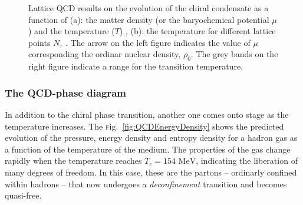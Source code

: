 \documentclass[ALICE,manyauthors]{cernphprep}
\newcommand{\Fig}       {\textsc{f}ig.~}
\newcommand{\fig}       {\Fig}
\newcommand {\unitStyle}[1] {\mbox{\ensuremath{\text{#1}}}}
\newcommand {\mev}      {\unitStyle{MeV}\xspace}
\begin{document}
\begin{figure}[h]
	\caption{Lattice QCD results on the evolution of the chiral condensate as a function of (a): the matter density (or the baryochemical potential $\mu$) and the temperature ($T$) \cite{muroyaLatticeQCDFinite2003}, (b): the temperature for different lattice points $N_{\tau}$ \cite{weiseChiralSymmetryStrongly2010}. The arrow on the left figure indicates the value of $\mu$ corresponding the ordinar nuclear density, $\rho_0$. The grey bands on the right figure indicate a range for the transition temperature.}
	\label{fig:ChiralSymmetryBreaking}
\end{figure}

\subsubsection{The QCD-phase diagram}
\label{subsubsec:QCDphasediagram}

In addition to the chiral phase transition, another one comes onto stage as the temperature increases. The \fig\ref{fig:QCDEnergyDensity} shows the predicted evolution of the pressure, energy density and entropy density for a hadron gas as a function of the temperature of the medium. The properties of the gas change rapidly when the temperature reaches $T_{c} = 154$ \mev, indicating the liberation of many degrees of freedom. In this case, these are the partons -- ordinarly confined within hadrons -- that now undergoes a \textit{deconfinement} transition and becomes quasi-free. 
\end{document}
